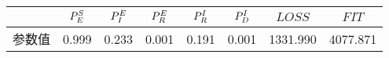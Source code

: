 \begin{tabular}{cccccccc}
\hline
&$\P{S}{E}$&$\P{E}{I}$&$\P{E}{R}$&$\P{I}{R}$&$\P{I}{D}$&$LOSS$&$FIT$\\
\hline
参数值&0.999&0.233&0.001&0.191&0.001&1331.990&4077.871\\
\hline
\end{tabular}